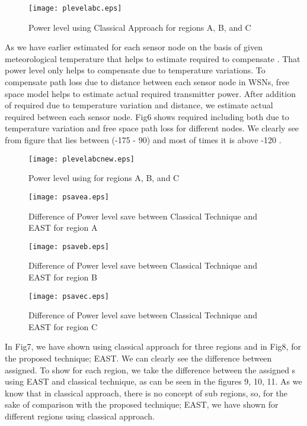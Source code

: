 \documentclass[12pt, conference, compsocconf, onecolumn, draftcls]{IEEEtran}
\begin{document}
\begin{figure}[h]
\begin{center}
\texttt{[image: plevelabc.eps]}
\caption{Power level using Classical Approach for regions A, B, and C}
\end{center}
\end{figure}

As we have earlier estimated  for each sensor node on the basis of given meteorological temperature that helps to estimate required  to compensate . That power level only helps to compensate  due to temperature variations. To compensate path loss due to distance  between each sensor node in WSNs, free space model helps to estimate actual required transmitter power. After addition of required  due to temperature variation and distance, we estimate actual required  between each sensor node. Fig6 shows required   including both  due to temperature variation and free space path loss for different nodes. We clearly see from figure that  lies between (-175 - 90) and most of times it is above -120 .

\begin{figure}[h]
\begin{center}
\texttt{[image: plevelabcnew.eps]}
\caption{ Power level using  for regions A, B, and C}
\end{center}
\end{figure}
\begin{figure}[h]
\begin{center}
\texttt{[image: psavea.eps]}
\caption{Difference of Power level save between Classical Technique and EAST for region A}
\end{center}
\end{figure}
\begin{figure}[h]
\begin{center}
\texttt{[image: psaveb.eps]}
\caption{Difference of Power level save between Classical Technique and EAST for region B}
\end{center}
\end{figure}
\begin{figure}[h]
\begin{center}
\texttt{[image: psavec.eps]}
\caption{Difference of Power level save between Classical Technique and EAST for region C}
\end{center}
\end{figure}

In Fig7, we have shown  using classical approach for three regions and in Fig8,  for the proposed technique; EAST. We can clearly see the difference between  assigned. To show  for each region, we take the difference between the assigned s using EAST and classical technique, as can be seen in the figures 9, 10, 11. As we know that in classical approach, there is no concept of sub regions, so, for the sake of comparison with the proposed technique; EAST, we have shown  for different regions using classical approach.
\end{document}
